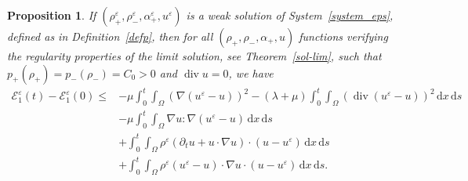 \documentclass[11pt, twoside, a4paper]{article}
\theoremstyle{plain}
\newtheorem{proposition}[theorem]{Proposition}
\theoremstyle{remark}
\numberwithin{equation}{section}
\def\EE{{\mathcal E}}
\newcommand{\dd}{\,\mathrm{d}}
\renewcommand{\div}{\operatorname{div}}
\renewcommand{\leq}{\leqslant}\renewcommand{\le}{\leqslant}
\renewcommand{\epsilon}{\varepsilon}
\newcommand{\eps}{\varepsilon}
\begin{document}
\begin{proposition}\label{prop1} If $(\rho^{\epsilon}_+,\rho^{\epsilon}_-,\alpha^{\epsilon}_+,u^{\epsilon})$ is a weak solution of System~\eqref{system_eps}, defined as in Definition~\ref{defp}, then for all $(\rho_+,\rho_-,\alpha_+,u)$ functions verifying the regularity properties of the limit solution, see Theorem~\ref{sol-lim}, such that $p_+(\rho_+) =p_-(\rho_-) = C_0>0$ and $\div u=0$, we have
 \begin{align*}
 \EE_1^\eps(t) - \EE_1^\eps(0) \leq& - \mu \int_0^t\!\!\! \int_{\Omega} \left( \nabla (u^{\epsilon}-u) \right)^2 - (\lambda+\mu) \int_0^t\!\!\! \int_{\Omega} \left( \div (u^{\epsilon}-u) \right)^2 \dd x \dd s \\
 &-\mu \int_0^t\!\!\! \int_{\Omega} \nabla u : \nabla(u^\eps-u) \dd x\dd s \\
 &+ \int_0^t\!\!\! \int_{\Omega} \rho^\eps (\partial_t u + u \cdot \nabla u)\cdot (u-u^{\epsilon}) \dd x \dd s \\
 &+ \int_0^t\!\!\! \int_{\Omega} \rho^\eps (u^{\epsilon}-u)\cdot \nabla u \cdot (u-u^{\epsilon}) \dd x \dd s. 
 \end{align*}
\end{proposition} 
\end{document}
